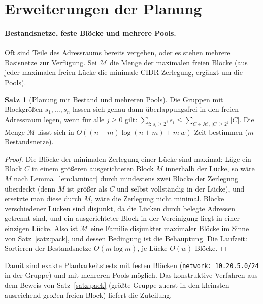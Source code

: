 \documentclass[a4paper,12pt, twoside]{report}
\theoremstyle{definition}
\newtheorem{satz}{Satz}
\begin{document}
\section{Erweiterungen der Planung}

\paragraph{Bestandsnetze, feste Blöcke und mehrere Pools.} Oft sind Teile des Adressraums bereits vergeben, oder es stehen mehrere Basisnetze zur Verfügung. Sei $\mathcal{M}$ die Menge der maximalen freien Blöcke (aus jeder maximalen freien Lücke die minimale CIDR-Zerlegung, ergänzt um die Pools).

\begin{satz}[Planung mit Bestand und mehreren Pools]
\label{satz:bestand}
	Die Gruppen mit Blockgrößen $s_1,\ldots,s_n$ lassen sich genau dann überlappungsfrei in den freien Adressraum legen, wenn für alle $j\ge0$ gilt: $\sum_{i:\,s_i\ge2^j}s_i \le \sum_{C\in\mathcal{M},\,|C|\ge2^j}|C|$. Die Menge $\mathcal{M}$ lässt sich in $O((n+m)\log(n+m) + m\,w)$ Zeit bestimmen ($m$ Bestandsnetze).
\end{satz}

\begin{proof}
	Die Blöcke der minimalen Zerlegung einer Lücke sind maximal: Läge ein Block $C$ in einem größeren ausgerichteten Block $M$ innerhalb der Lücke, so wäre $M$ nach Lemma~\ref{lem:laminar} durch mindestens zwei Blöcke der Zerlegung überdeckt (denn $M$ ist größer als $C$ und selbst vollständig in der Lücke), und ersetzte man diese durch $M$, wäre die Zerlegung nicht minimal. Blöcke verschiedener Lücken sind disjunkt, da die Lücken durch belegte Adressen getrennt sind, und ein ausgerichteter Block in der Vereinigung liegt in einer einzigen Lücke. Also ist $\mathcal{M}$ eine Familie disjunkter maximaler Blöcke im Sinne von Satz~\ref{satz:pack}, und dessen Bedingung ist die Behauptung. Die Laufzeit: Sortieren der Bestandsnetze $O(m\log m)$, je Lücke $O(w)$ Blöcke.
\end{proof}

Damit sind exakte Planbarkeitstests mit festen Blöcken (\texttt{network: 10.20.5.0/24} in der Gruppe) und mit mehreren Pools möglich. Das konstruktive Verfahren aus dem Beweis von Satz~\ref{satz:pack} (größte Gruppe zuerst in den kleinsten ausreichend großen freien Block) liefert die Zuteilung.
\end{document}
